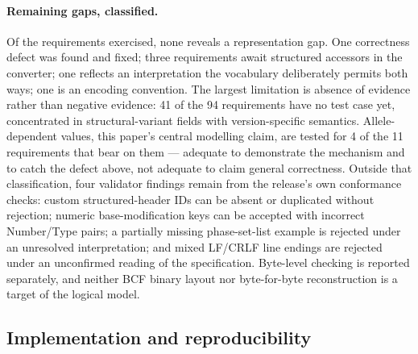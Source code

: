 \documentclass{ceurart}
\begin{document}
\paragraph{Remaining gaps, classified.}
Of the requirements exercised, none reveals a representation gap. 
One correctness defect was found and fixed; three requirements await structured accessors in the converter; one reflects an interpretation the vocabulary deliberately permits both ways; one is an encoding convention. 
The largest limitation is absence of evidence rather than negative evidence: 41 of the 94 requirements have no test case yet, concentrated in structural-variant fields with version-specific semantics. 
Allele-dependent values, this paper's central modelling claim, are tested for 4 of the 11 requirements that bear on them --- adequate to demonstrate the mechanism and to catch the defect above, not adequate to claim general correctness. 
Outside that classification, four validator findings remain from the release's own conformance checks: custom structured-header IDs can be absent or duplicated without rejection; numeric base-modification keys can be accepted with incorrect Number/Type pairs; a partially missing phase-set-list example is rejected under an unresolved interpretation; and mixed LF/CRLF line endings are rejected under an unconfirmed reading of the specification. 
Byte-level checking is reported separately, and neither BCF binary layout nor byte-for-byte reconstruction is a target of the logical model.

\subsection{Implementation and reproducibility}
\label{sec:implementation}
\end{document}
